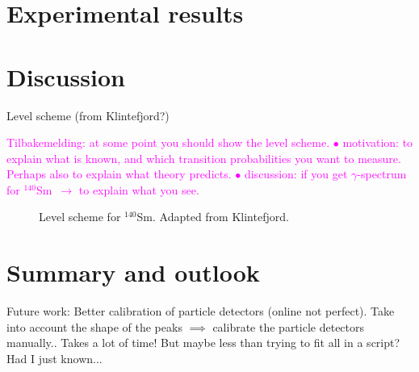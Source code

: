 \documentclass[twoside,english]{uiofysmaster/uiofysmaster}
\newcommand{\Sm}{$^{140}$Sm} %
\newcommand{\ga}{$\gamma$}
\begin{document}


\chapter{Experimental results}




\chapter{Discussion}

Level scheme (from Klintefjord?)\newline

\textcolor{Magenta}{Tilbakemelding: \newline
at some point you should show the level scheme. \newline
$\bullet$ motivation: to explain what is known, and which transition probabilities you want to measure.  \newline
Perhaps also to explain what theory predicts. \newline
$\bullet$ discussion: if you get \ga-spectrum for \Sm ~$\rightarrow$ to explain what you see.}


\begin{figure}
	\centering
	
	\caption{Level scheme for \Sm. Adapted from Klintefjord.}
	\label{fig:levels}
\end{figure}





\chapter{Summary and outlook}

Future work: Better calibration of particle detectors (online not perfect). Take into account the shape of the peaks $\implies$ calibrate the particle detectors manually.. Takes a lot of time! But maybe less than trying to fit all in a script? Had I just known...
\end{document}
